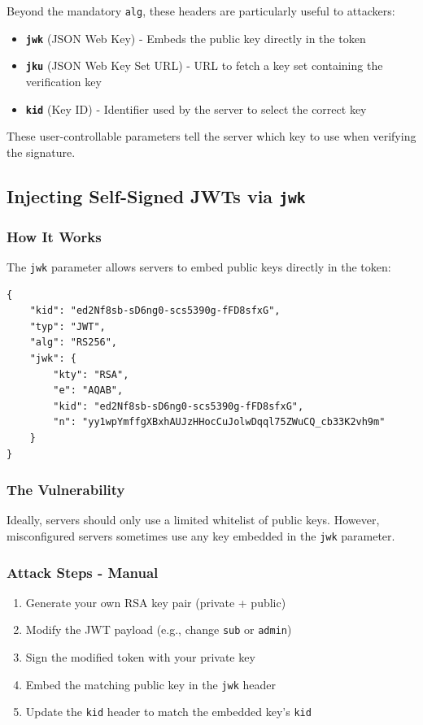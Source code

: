 \documentclass{article}
\begin{document}
Beyond the mandatory \texttt{alg}, these headers are particularly useful to attackers:

\begin{itemize}
    \item \textbf{\texttt{jwk}} (JSON Web Key) - Embeds the public key directly in the token
    \item \textbf{\texttt{jku}} (JSON Web Key Set URL) - URL to fetch a key set containing the verification key
    \item \textbf{\texttt{kid}} (Key ID) - Identifier used by the server to select the correct key
\end{itemize}

These user-controllable parameters tell the server which key to use when verifying the signature.

\subsection{Injecting Self-Signed JWTs via \texttt{jwk}}

\subsubsection{How It Works}

The \texttt{jwk} parameter allows servers to embed public keys directly in the token:

\begin{lstlisting}[caption=JWT Header with Embedded JWK]
{
    "kid": "ed2Nf8sb-sD6ng0-scs5390g-fFD8sfxG",
    "typ": "JWT",
    "alg": "RS256",
    "jwk": {
        "kty": "RSA",
        "e": "AQAB",
        "kid": "ed2Nf8sb-sD6ng0-scs5390g-fFD8sfxG",
        "n": "yy1wpYmffgXBxhAUJzHHocCuJolwDqql75ZWuCQ_cb33K2vh9m"
    }
}
\end{lstlisting}

\subsubsection{The Vulnerability}

Ideally, servers should only use a limited whitelist of public keys. However, misconfigured servers sometimes use any key embedded in the \texttt{jwk} parameter.

\subsubsection{Attack Steps - Manual}

\begin{enumerate}
    \item Generate your own RSA key pair (private + public)
    \item Modify the JWT payload (e.g., change \texttt{sub} or \texttt{admin})
    \item Sign the modified token with your private key
    \item Embed the matching public key in the \texttt{jwk} header
    \item Update the \texttt{kid} header to match the embedded key's \texttt{kid}
\end{enumerate}
\end{document}
